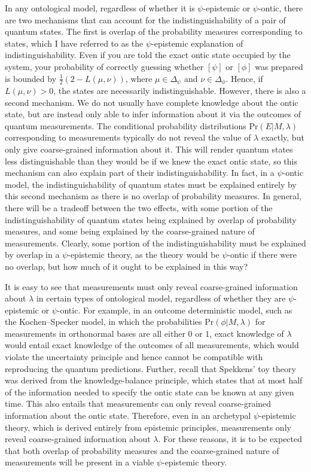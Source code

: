\documentclass[DIV=calc,paper=a4,fontsize=11pt,twocolumn]{scrartcl} %
\theoremstyle{definition}
\theoremstyle{plain}
\newcommand{\Proj}[1]{\ensuremath{\left [ #1 \right ]}}
\begin{document}
In any ontological model, regardless of whether it is $\psi$-epistemic
or $\psi$-ontic, there are two mechanisms that can account for the
indistinguishability of a pair of quantum states.  The first is
overlap of the probability measures corresponding to states, which I
have referred to as the $\psi$-epistemic explanation of
indistinguishability.  Even if you are told the exact ontic state
occupied by the system, your probability of correctly guessing whether
$\Proj{\psi}$ or $\Proj{\phi}$ was prepared is bounded by $\frac{1}{2}
\left ( 2 - L(\mu,\nu) \right )$, where $\mu \in \Delta_{\psi}$ and
$\nu \in \Delta_{\phi}$.  Hence, if $L(\mu,\nu) > 0$, the states are
necessarily indistinguishable.  However, there is also a second
mechanism.  We do not usually have complete knowledge about the ontic
state, but are instead only able to infer information about it via the
outcomes of quantum measurements.  The conditional probability
distributions $\text{Pr}(E|M,\lambda)$ corresponding to measurements
typically do not reveal the value of $\lambda$ exactly, but only give
coarse-grained information about it.  This will render quantum states
less distinguishable than they would be if we knew the exact ontic
state, so this mechanism can also explain part of their
indistinguishability.  In fact, in a $\psi$-ontic model, the
indistinguishability of quantum states must be explained entirely by
this second mechanism as there is no overlap of probability measures.
In general, there will be a tradeoff between the two effects, with
some portion of the indistinguishability of quantum states being
explained by overlap of probability measures, and some being explained
by the coarse-grained nature of measurements.  Clearly, some portion
of the indistinguishability must be explained by overlap in a
$\psi$-epistemic theory, as the theory would be $\psi$-ontic if there
were no overlap, but how much of it ought to be explained in this way?

It is easy to see that measurements must only reveal coarse-grained
information about $\lambda$ in certain types of ontological model,
regardless of whether they are $\psi$-epistemic or $\psi$-ontic.  For
example, in an outcome deterministic model, such as the Kochen--Specker
model, in which the probabilities $\text{Pr}(\phi|M,\lambda)$ for
measurements in orthonormal bases are all either $0$ or $1$, exact
knowledge of $\lambda$ would entail exact knowledge of the outcomes of
all measurements, which would violate the uncertainty principle and
hence cannot be compatible with reproducing the quantum predictions.
Further, recall that Spekkens' toy theory was derived from the
knowledge-balance principle, which states that at most half of the
information needed to specify the ontic state can be known at any
given time.  This also entails that measurements can only reveal
coarse-grained information about the ontic state.  Therefore, even in
an archetypal $\psi$-epistemic theory, which is derived entirely from
epistemic principles, measurements only reveal coarse-grained
information about $\lambda$.  For these reasons, it is to be expected
that both overlap of probability measures and the coarse-grained
nature of measurements will be present in a viable $\psi$-epistemic
theory.
\end{document}

